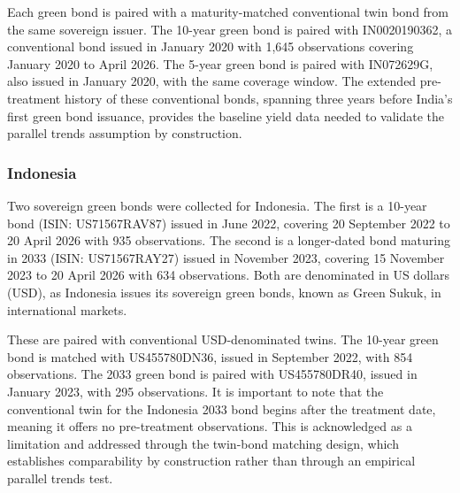 \documentclass[12pt,a4paper]{article}
\begin{document}
Each green bond is paired with a maturity-matched conventional twin bond from the same sovereign issuer. The 10-year green bond is paired with IN0020190362, a conventional bond issued in January 2020 with 1,645 observations covering January 2020 to April 2026. The 5-year green bond is paired with IN072629G, also issued in January 2020, with the same coverage window. The extended pre-treatment history of these conventional bonds, spanning three years before India's first green bond issuance, provides the baseline yield data needed to validate the parallel trends assumption by construction.

\subsubsection{Indonesia}

Two sovereign green bonds were collected for Indonesia. The first is a 10-year bond (ISIN: US71567RAV87) issued in June 2022, covering 20 September 2022 to 20 April 2026 with 935 observations. The second is a longer-dated bond maturing in 2033 (ISIN: US71567RAY27) issued in November 2023, covering 15 November 2023 to 20 April 2026 with 634 observations. Both are denominated in US dollars (USD), as Indonesia issues its sovereign green bonds, known as Green Sukuk, in international markets.

These are paired with conventional USD-denominated twins. The 10-year green bond is matched with US455780DN36, issued in September 2022, with 854 observations. The 2033 green bond is paired with US455780DR40, issued in January 2023, with 295 observations. It is important to note that the conventional twin for the Indonesia 2033 bond begins after the treatment date, meaning it offers no pre-treatment observations. This is acknowledged as a limitation and addressed through the twin-bond matching design, which establishes comparability by construction rather than through an empirical parallel trends test.
\end{document}
